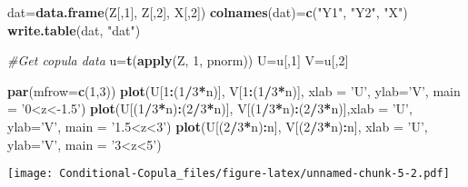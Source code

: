 \documentclass[]{article}
\newenvironment{Shaded}{\begin{snugshade}}{\end{snugshade}}
\newcommand{\KeywordTok}[1]{\textcolor[rgb]{0.13,0.29,0.53}{\textbf{#1}}}
\newcommand{\DataTypeTok}[1]{\textcolor[rgb]{0.13,0.29,0.53}{#1}}
\newcommand{\DecValTok}[1]{\textcolor[rgb]{0.00,0.00,0.81}{#1}}
\newcommand{\StringTok}[1]{\textcolor[rgb]{0.31,0.60,0.02}{#1}}
\newcommand{\CommentTok}[1]{\textcolor[rgb]{0.56,0.35,0.01}{\textit{#1}}}
\newcommand{\OperatorTok}[1]{\textcolor[rgb]{0.81,0.36,0.00}{\textbf{#1}}}
\newcommand{\NormalTok}[1]{#1}
\begin{document}
\begin{Shaded}
\begin{Highlighting}[]
\NormalTok{dat=}\KeywordTok{data.frame}\NormalTok{(Z[,}\DecValTok{1}\NormalTok{], Z[,}\DecValTok{2}\NormalTok{], X[,}\DecValTok{2}\NormalTok{])}
\KeywordTok{colnames}\NormalTok{(dat)=}\KeywordTok{c}\NormalTok{(}\StringTok{"Y1"}\NormalTok{, }\StringTok{"Y2"}\NormalTok{, }\StringTok{"X"}\NormalTok{)}
\KeywordTok{write.table}\NormalTok{(dat, }\StringTok{"dat"}\NormalTok{)}

\CommentTok{#Get copula data}
\NormalTok{u=}\KeywordTok{t}\NormalTok{(}\KeywordTok{apply}\NormalTok{(Z, }\DecValTok{1}\NormalTok{, pnorm))}
\NormalTok{U=u[,}\DecValTok{1}\NormalTok{]}
\NormalTok{V=u[,}\DecValTok{2}\NormalTok{]}

\KeywordTok{par}\NormalTok{(}\DataTypeTok{mfrow=}\KeywordTok{c}\NormalTok{(}\DecValTok{1}\NormalTok{,}\DecValTok{3}\NormalTok{))}
\KeywordTok{plot}\NormalTok{(U[}\DecValTok{1}\OperatorTok{:}\NormalTok{(}\DecValTok{1}\OperatorTok{/}\DecValTok{3}\OperatorTok{*}\NormalTok{n)], V[}\DecValTok{1}\OperatorTok{:}\NormalTok{(}\DecValTok{1}\OperatorTok{/}\DecValTok{3}\OperatorTok{*}\NormalTok{n)], }\DataTypeTok{xlab =} \StringTok{'U'}\NormalTok{, }\DataTypeTok{ylab=}\StringTok{'V'}\NormalTok{, }\DataTypeTok{main =} \StringTok{'0<z<-1.5'}\NormalTok{)}
\KeywordTok{plot}\NormalTok{(U[(}\DecValTok{1}\OperatorTok{/}\DecValTok{3}\OperatorTok{*}\NormalTok{n)}\OperatorTok{:}\NormalTok{(}\DecValTok{2}\OperatorTok{/}\DecValTok{3}\OperatorTok{*}\NormalTok{n)], V[(}\DecValTok{1}\OperatorTok{/}\DecValTok{3}\OperatorTok{*}\NormalTok{n)}\OperatorTok{:}\NormalTok{(}\DecValTok{2}\OperatorTok{/}\DecValTok{3}\OperatorTok{*}\NormalTok{n)],}\DataTypeTok{xlab =} \StringTok{'U'}\NormalTok{, }\DataTypeTok{ylab=}\StringTok{'V'}\NormalTok{, }\DataTypeTok{main =} \StringTok{'1.5<z<3'}\NormalTok{)}
\KeywordTok{plot}\NormalTok{(U[(}\DecValTok{2}\OperatorTok{/}\DecValTok{3}\OperatorTok{*}\NormalTok{n)}\OperatorTok{:}\NormalTok{n], V[(}\DecValTok{2}\OperatorTok{/}\DecValTok{3}\OperatorTok{*}\NormalTok{n)}\OperatorTok{:}\NormalTok{n], }\DataTypeTok{xlab =} \StringTok{'U'}\NormalTok{, }\DataTypeTok{ylab=}\StringTok{'V'}\NormalTok{, }\DataTypeTok{main =} \StringTok{'3<z<5'}\NormalTok{)}
\end{Highlighting}
\end{Shaded}

\texttt{[image: Conditional-Copula\_files/figure-latex/unnamed-chunk-5-2.pdf]}
\end{document}
